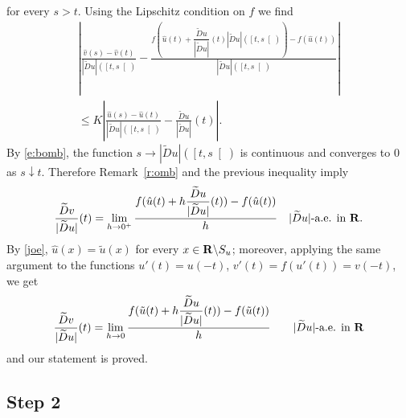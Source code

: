 for every $s>t$. Using the Lipschitz condition on $f$ we find
{\setlength{\multlinegap}{0pt}
\begin{multline*}
\left|\frac{\hat v(s)-\hat v(t)}{|\widetilde{D}u|(\left[t,s\right[)}
-\frac{f(\hat u(t)+\dfrac{\widetilde{D}u}{|\widetilde{D}u|}(t)
|\widetilde{D}u|(\left[t,s\right[))-f(\hat
u(t))}{|\widetilde{D}u|(\left[t,s\right[)}\right|\\
\le K\left|
\frac{\hat u(s)-\hat u(t)}{|\widetilde{D}u|(\left[t,s\right[)}
-\frac{\widetilde{D}u}{|
\widetilde{D}u|}(t)\right|.\end{multline*}
}%
By \eqref{e:bomb}, the function $s\to |\widetilde{D}u|(\left[t,s\right[)$
is continuous
and converges to 0 as $s\downarrow t$. Therefore Remark~\ref{r:omb}
and the previous inequality imply
\[\frac{\widetilde{D}v}{|\widetilde{D}u|}(t)=\lim_{h\to 0^+}
\frac{f(\hat u(t)+h\dfrac{\widetilde{D}u}{|\widetilde{D}u|}
(t))-f(\hat u(t))}h\quad|\widetilde{D}u|\text{-a.e. in }\bold R.\]
By \eqref{joe}, $\hat u(x)=\tilde u(x)$ for every $x\in\bold R\backslash S_u$;
moreover, applying the same argument to the functions $u'(t)=u(-t)$,
$v'(t)=f(u'(t))=v(-t)$, we get
\[\frac{\widetilde{D}v}{|\widetilde{D}u|}(t)=\lim_{h\to 0}
\frac{f(\tilde u(t)+h\dfrac{\widetilde{D}u}{|\widetilde{D}u|}(t))-f(\tilde
u(t))}{h}\qquad|\widetilde{D}u|\text{-a.e. in }\bold R\]
and our statement is proved.

\subsection*{Step 2}

